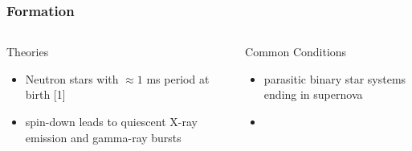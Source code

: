 \documentclass[hyperref=pdftex, presentation]{beamer}
\begin{document}
\begin{frame}{}
\frametitle{\Large Formation}
\begin{columns}[c] %

\begin{block}{Theories}
\begin{itemize}
 \item<2-> Neutron stars with $\approx 1$ ms period at birth [1]%
 \item<4-> spin-down leads to quiescent X-ray emission and gamma-ray bursts
\end{itemize}
\end{block}
\begin{block}{Common Conditions}
\begin{itemize}
	\item<3-> parasitic binary star systems ending in supernova %
	\item<5-> 
\end{itemize}
\end{block}


\end{columns}
\end{frame}






\end{document}
